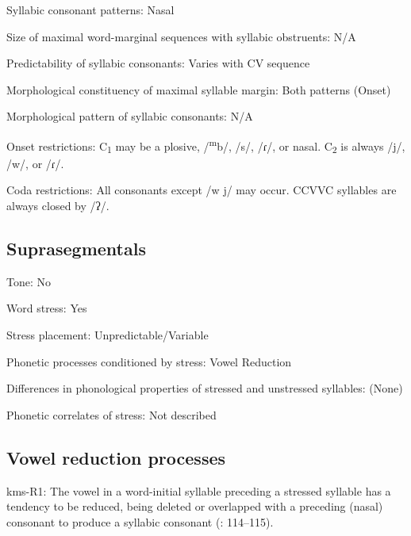 {\begin{appendixdesc}
\item[Syllabic consonant patterns:] Nasal

\item[Size of maximal word-marginal sequences with syllabic obstruents:] N/A

\item[Predictability of syllabic consonants:] Varies with CV sequence

\item[Morphological constituency of maximal syllable margin:] Both patterns (Onset)

\item[Morphological pattern of syllabic consonants:] N/A

\item[Onset restrictions:] C\textsubscript{1} may be a plosive, /\textsuperscript{m}b/, /s/, /ɾ/, or nasal. C\textsubscript{2} is always /j/, /w/, or /ɾ/.

\item[Coda restrictions:] All consonants except /w j/ may occur. CCVVC syllables are always closed by /ʔ/.
\end{appendixdesc}
\subsection*{Suprasegmentals}
\begin{appendixdesc}
\item[Tone:] No

\item[Word stress:] Yes

\item[Stress placement:] Unpredictable/Variable

\item[Phonetic processes conditioned by stress:] Vowel Reduction

\item[Differences in phonological properties of stressed and unstressed syllables:] (None)

\item[Phonetic correlates of stress:] Not described
\end{appendixdesc}
\subsection*{Vowel reduction processes}
\begin{appendixdesc}

\item[kms-R1:] The vowel in a word-initial syllable preceding a stressed syllable has a tendency to be reduced, being deleted or overlapped with a preceding (nasal) consonant to produce a syllabic consonant (\citealt{SandersSanders1980}: 114--115).


\end{appendixdesc}}
